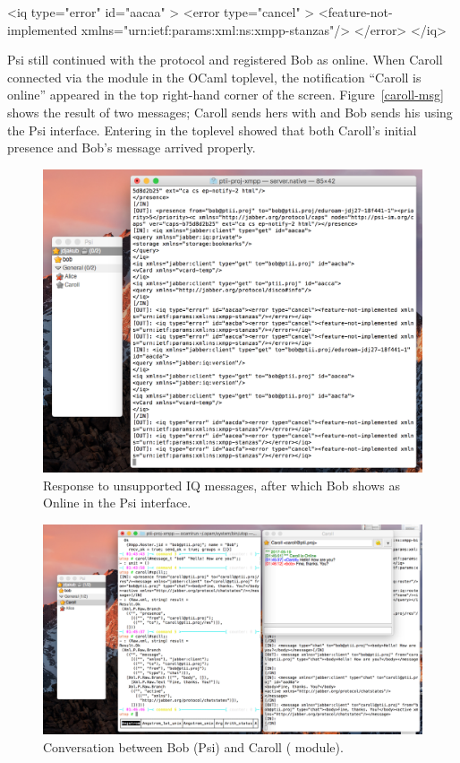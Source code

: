 \documentclass[12pt,a4paper,twoside,openright]{report}
\begin{document}
{\begin{xml}
<iq type="error" id="aacaa" >
  <error type="cancel" >
    <feature-not-implemented xmlns="urn:ietf:params:xml:ns:xmpp-stanzas"/>
  </error>
</iq>
\end{xml}

Psi still continued with the protocol and registered Bob as online. When Caroll connected via the  module in the OCaml toplevel, the notification ``Caroll is online'' appeared in the top right-hand corner of the screen. Figure~\ref{caroll-msg} shows the result of two messages; Caroll sends hers with  and Bob sends his using the Psi interface. Entering  in the toplevel showed that both Caroll's initial presence and Bob's message arrived properly.

\begin{figure}
  \centering\includegraphics[width=\textwidth]{../transcripts/iq_errors.png}
  \caption{Response to unsupported IQ messages, after which Bob shows as Online in the Psi interface.}
  \label{fig:iq-errors}
\end{figure}

\begin{figure}
  \centering\includegraphics[width=\textwidth]{../transcripts/caroll_msg.png}
  \caption{Conversation between Bob (Psi) and Caroll ( module).}
  \label{fig:caroll-msg}
\end{figure}

}
\end{document}
